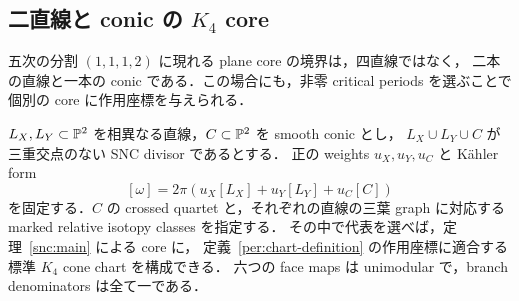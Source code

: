\subsection{二直線と conic の \texorpdfstring{$K_4$}{K4} core}
\label{mixper:section}

五次の分割 $(1,1,1,2)$ に現れる plane core の境界は，四直線ではなく，
二本の直線と一本の conic である．この場合にも，非零 critical periods を選ぶことで
個別の core に作用座標を与えられる．

\begin{proposition}\label{mixper:realization}
$L_X,L_Y\subset\mathbb P^2$ を相異なる直線，$C\subset\mathbb P^2$ を smooth conic とし，
$L_X\cup L_Y\cup C$ が三重交点のない SNC divisor であるとする．
正の weights $u_X,u_Y,u_C$ と Kähler form
\[
 [\omega]=2\pi(u_X[L_X]+u_Y[L_Y]+u_C[C])
\]
を固定する．$C$ の crossed quartet と，それぞれの直線の三葉 graph に対応する
marked relative isotopy classes を指定する．
その中で代表を選べば，定理~\ref{snc:main} による core に，
定義~\ref{per:chart-definition} の作用座標に適合する標準 $K_4$ cone chart を構成できる．
六つの face maps は unimodular で，branch denominators は全て一である．
\end{proposition}

